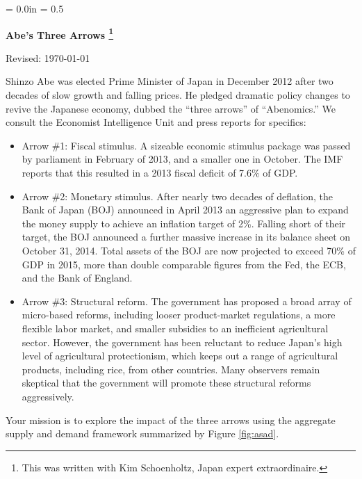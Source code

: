 \documentclass[12pt]{article}
\def\HeadName{Abe's Three Arrows}
\begin{document}
\parindent = 0.0in
\parskip = 0.5\bigskipamount
\thispagestyle{empty}%
\Head

\centerline{\large \bf \HeadName%
\footnote{This was written with Kim Schoenholtz, Japan expert extraordinaire.}
}%
\centerline{Revised:  \today}

\bigskip
Shinzo Abe was elected Prime Minister of Japan in December 2012
after two decades of slow growth and falling prices.
He pledged dramatic policy changes to revive the Japanese economy,
dubbed the ``three arrows'' of ``Abenomics.''
We consult the Economist Intelligence Unit and press reports for specifics:
%
\begin{itemize}
\item Arrow \#1:  Fiscal stimulus.  A sizeable economic stimulus package was passed by parliament in
February of 2013, and a smaller one in October.
The IMF reports that this resulted in a 2013 fiscal deficit of 7.6\% of GDP.  

\item Arrow \#2: Monetary stimulus. 
After nearly two decades of deflation, the Bank of Japan (BOJ) announced in April 2013 
an aggressive plan to expand the money supply 
to achieve an inflation target of 2\%.
Falling short of their target, the BOJ announced 
a further massive increase in its balance sheet on October 31, 2014.
Total assets of the BOJ are now projected to exceed 70\% of GDP in 2015, 
more than double comparable figures from the Fed, the ECB, and the Bank of England.  

\item Arrow \#3: Structural reform.
The government has proposed a broad array of micro-based reforms, 
including looser product-market regulations, 
a more flexible labor market, 
and smaller subsidies to an inefficient agricultural sector. 
However, the government has been reluctant to reduce Japan's high level of agricultural protectionism,
which keeps out a range of agricultural products, including rice, from other countries.
Many observers remain skeptical that the government will promote these structural reforms aggressively.
\end{itemize}
%
Your mission is to explore the impact of the three arrows using 
the aggregate supply and demand framework summarized by Figure \ref{fig:asad}.
\end{document}
